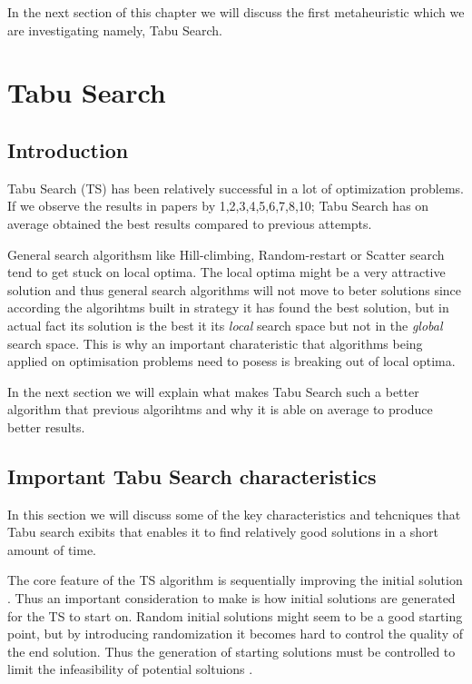 In the next section of this chapter we will discuss the first metaheuristic which we are investigating namely, Tabu Search.
\section{Tabu Search}
\subsection{Introduction}
Tabu Search (TS) has been relatively successful in a lot of optimization problems. If we observe the results in papers by 1,2,3,4,5,6,7,8,10; Tabu Search has on average obtained the best results compared to previous attempts. %

General search algorithsm like Hill-climbing, Random-restart or Scatter search tend to get stuck on local optima. The local optima might be a very attractive solution and thus general search algorithms will not move to beter solutions since according the algorihtms built in strategy it has found the best solution, but in actual fact its solution is the best it its \emph{local} search space but not in the \emph{global} search space. This is why an important charateristic that algorithms being applied on optimisation problems need to posess is breaking out of local optima.

In the next section we will explain what makes Tabu Search such a better algorithm that previous algorihtms and why it is able on average to produce better results.

\subsection{Important Tabu Search characteristics}
In this section we will discuss some of the key characteristics and tehcniques that Tabu search exibits that enables it to find relatively good solutions in a short amount of time.

The core feature of the TS algorithm is sequentially improving the initial solution \cite{TSHazardous}. Thus an important consideration to make is how initial solutions are generated for the TS to start on. Random initial solutions might seem to be a good starting point, but by introducing randomization it becomes hard to control the quality of the end solution. Thus the generation of starting solutions must be controlled to limit the infeasibility of potential soltuions \cite{TSHazardous}.

